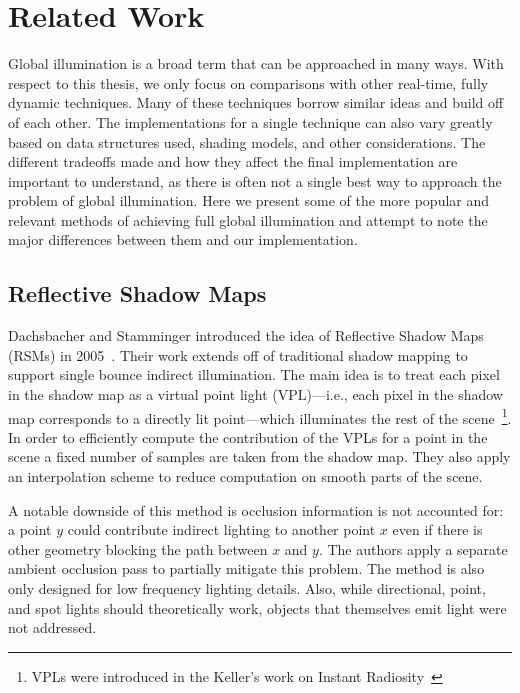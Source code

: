 \chapter{Related Work}

Global illumination is a broad term that can be approached in many ways. With respect to this thesis, we only focus on comparisons with other real-time, fully dynamic techniques. Many of these techniques borrow similar ideas and build off of each other. The implementations for a single technique can also vary greatly based on data structures used, shading models, and other considerations. The different tradeoffs made and how they affect the final implementation are important to understand, as there is often not a single best way to approach the problem of global illumination. Here we present some of the more popular and relevant methods of achieving full global illumination and attempt to note the major differences between them and our implementation.

\section{Reflective Shadow Maps}
Dachsbacher and Stamminger introduced the idea of Reflective Shadow Maps (RSMs) in 2005~\cite{Dachsbacher:2005:RSM:1053427.1053460}. Their work extends off of traditional shadow mapping to support single bounce indirect illumination. The main idea is to treat each pixel in the shadow map as a virtual point light (VPL)---i.e., each pixel in the shadow map corresponds to a directly lit point---which illuminates the rest of the scene~\footnote{VPLs were introduced in the Keller's work on Instant Radiosity~\cite{Keller:1997:IR:258734.258769}}. In order to efficiently compute the contribution of the VPLs for a point in the scene a fixed number of samples are taken from the shadow map. They also apply an interpolation scheme to reduce computation on smooth parts of the scene.

A notable downside of this method is occlusion information is not accounted for: a point $y$ could contribute indirect lighting to another point $x$ even if there is other geometry blocking the path between $x$ and $y$. The authors apply a separate ambient occlusion pass to partially mitigate this problem. The method is also only designed for low frequency lighting details. Also, while directional, point, and spot lights should theoretically work, objects that themselves emit light were not addressed.

